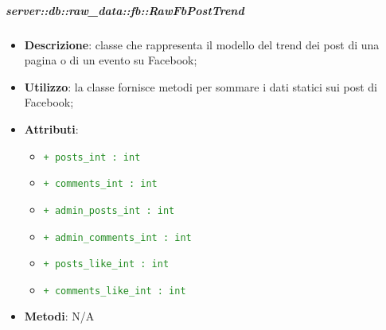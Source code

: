 

			\subparagraph{server::db::raw\_data::fb::RawFbPostTrend} %
			\label{subp:server_db_raw_data_fb_RawFbPostTrend}
				\begin{itemize}
					\item \textbf{Descrizione}: classe che rappresenta il modello del trend dei post di una pagina o di un evento su Facebook;
					\item \textbf{Utilizzo}: la classe fornisce metodi per sommare i dati statici sui post di Facebook;
					\item \textbf{Attributi}:
					\begin{itemize}
						\item \textcolor{forestgreen}{\texttt{+ posts\_int : int}}
						\item \textcolor{forestgreen}{\texttt{+ comments\_int : int}}
						\item \textcolor{forestgreen}{\texttt{+ admin\_posts\_int : int}}
						\item \textcolor{forestgreen}{\texttt{+ admin\_comments\_int : int}}
						\item \textcolor{forestgreen}{\texttt{+ posts\_like\_int : int}}
						\item \textcolor{forestgreen}{\texttt{+ comments\_like\_int : int}}
					\end{itemize}
					\item \textbf{Metodi}: N/A
				\end{itemize}


